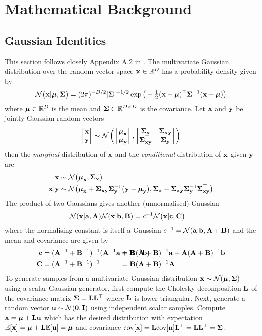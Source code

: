 \appendix

\chapter{M\lowercase{athematical} B\lowercase{ackground}}


\section{Gaussian Identities} \label{app:gauss}
This section follows closely Appendix A.2 in \cite{RaWi06}. The multivariate Gaussian distribution over the random vector space $\bx \in \RR^D$ has a probability density given by
\begin{equation}
\cN\bil\bx|\bm,\bS\bir = (2\pi)^{-D/2} |\bS|^{-1/2} \exp \bil -\half (\bx - \bm)\T\bS\inv (\bx - \bm) \bir
\end{equation}
where $\bm \in \RR^D$ is the mean and $\bS\in \RR^{D\times D}$ is the covariance. Let $\bx$ and $\by$ be jointly Gaussian random vectors
\begin{equation}
\bmat{\bx \\ \by} \sim \cN\left(
\bmat{\bm_{\bx} \\ \bm_{\by}},
\bmat{\bS_{\bx} & \bS_{\bx\by} \\ \bS_{\bx\by}\T & \bS_{\by}}
\right)
\end{equation}
then the \textit{marginal} distribution of $\bx$ and the \textit{conditional} distribution of $\bx$ given $\by$ are
\begin{align}
\bx &\sim \cN\big( \bm_{\bx}, \bS_{\bx} \big) \\
\bx|\by &\sim \cN\big( \bm_{\bx} + \bS_{\bx\by} \bS_{\by}^{-1} \big( \by - \bm_{\by} \big),
\bS_{\bx} - \bS_{\bx\by} \bS_{\by}^{-1} \bS_{\bx\by}\T \big)
\end{align}
The product of two Gaussians gives another (unnormalised) Gaussian
\begin{align}
\cN(\bx|\ba, \bA)\cN(\bx|\bb, \bB) &= c^{-1}\cN\big(\bx|\bc, \bC \big) 
\end{align}
where the normalising constant is itself a Gaussian $c^{-1} = \cN(\ba|\bb, \bA+\bB)$ and the mean and covariance are given by
\begin{align*}
\bc &= (\bA^{-1} + \bB^{-1})^{-1}(\bA^{-1}\ba + \bB^{-1}\bb)
&&\!\!\!\!\!\!\!\!\!\!\!\!\!\!\!\!\!\!\!\!\!\!\!\!\!\!\!\!\!\!\! = \bB(\bA + \bB)^{-1}\ba + \bA(\bA + \bB)^{-1}\bb \\
\bC &= (\bA^{-1} + \bB^{-1})^{-1}
&&\!\!\!\!\!\!\!\!\!\!\!\!\!\!\!\!\!\!\!\!\!\!\!\!\!\!\!\!\!\!\! = \bB(\bA + \bB)^{-1}\bA
\end{align*}
To generate samples from a multivariate Gaussian distribution $\bx \sim \cN(\bm,\bS)$ using a scalar Gaussian generator, first compute the Cholesky decomposition $\bL$ of the covariance matrix $\bS = \bL\bL\T$ where $\bL$ is lower triangular. Next, generate a random vector $\bu \sim \cN(\mathbf{0}, \bI)$ using independent scalar samples. Compute $\bx = \bm + \bL\bu$ which has the desired distribution with expectation $\EE[\bx] = \bm + \bL\EE[\bu] = \bm$ and covariance $\cov[\bx] = \bL\cov[\bu]\bL\T = \bL\bL\T = \bS$.



